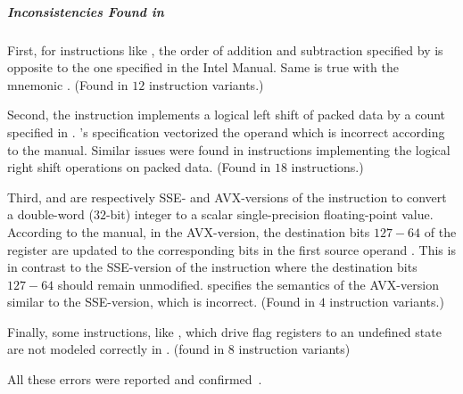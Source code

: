 \vspace{-2pt}
\subparagraph{Inconsistencies Found in \Stoke}

First, for instructions like  , the order of addition and subtraction specified by \Stoke is opposite to the one specified in the Intel Manual. Same is true with the mnemonic . (Found in $12$ instruction variants.)

Second, the instruction  implements a logical left shift of packed data by a count specified in . \Stoke's specification vectorized the operand  which is incorrect according to the manual. Similar issues were found in instructions implementing the logical right shift operations on packed data. (Found in  $18$ instructions.)

Third,    and     are respectively SSE- and AVX-versions of the instruction to  convert a double-word ($32$-bit) integer to a scalar single-precision floating-point value. According to the manual, in the AVX-version,  the  destination bits $127-64$ of the  register  are updated to the corresponding bits in the first source operand . This  is in contrast to the SSE-version of the instruction where the destination bits $127-64$ should remain unmodified. \Stoke specifies the semantics of the AVX-version similar to the SSE-version, which is incorrect.  (Found in $4$ instruction variants.)

Finally, some instructions, like , which drive flag registers to an undefined state are not modeled correctly in \Stoke.    (found in $8$ instruction variants)

All these errors were reported and confirmed~\cite{BugStoke983,BugStoke986}.


